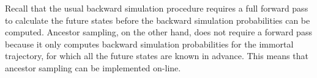 Recall that the usual backward simulation procedure requires a full forward pass to calculate the future states before the backward simulation probabilities can be computed. Ancestor sampling, on the other hand, does not require a forward pass because it only computes backward simulation probabilities for the immortal trajectory, for which all the future states are known in advance. This means that ancestor sampling can be implemented on-line.

%
%
%




